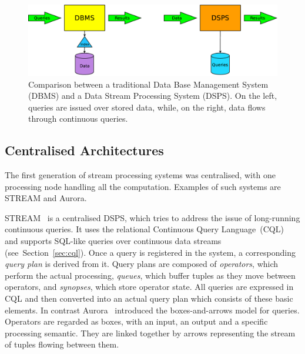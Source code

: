 \begin{figure}[t!] \centering \includegraphics[width=\textwidth]{img/tesi/dbms+dsms} \caption{Comparison
between a traditional Data Base Management System (DBMS) and a Data Stream Processing System (DSPS). On
the left, queries are issued over stored data, while, on the right, data flows through continuous
queries.}
\label{fig:dbms+dsms}
\end{figure}

\subsection*{Centralised Architectures}

The first generation of stream processing systems was centralised, with one processing node handling all
the computation. Examples of such systems are STREAM and Aurora.

STREAM~\cite{stream, stream-babcock, stream-chains} is a centralised DSPS, which tries to address the
issue of long-running continuous queries. It uses the relational Continuous Query
Language~(CQL)~\cite{cql} and supports SQL-like queries over continuous data
streams (see~Section~\ref{sec:cql}).
Once a query is registered in the system, a corresponding \textit{query plan} is derived from it.
Query plans are composed of \textit{operators}, which perform the actual processing, \textit{queues},
which buffer tuples as they move between operators, and \textit{synopses}, which store operator state.
All queries are expressed in CQL and then converted into an actual query plan which consists of these
basic elements.
In contrast Aurora~\cite{aurora} introduced the boxes-and-arrows model for queries. Operators are
regarded as boxes, with an input, an output and a specific processing semantic. They are linked
together by arrows representing the stream of tuples flowing between them.
			
